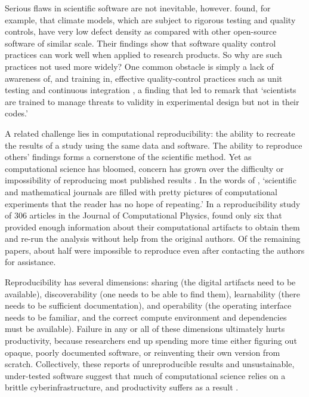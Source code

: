 \documentclass[12pt]{amsart}
\begin{document}
Serious flaws in scientific software are not inevitable, however. \citet{pipitone2012assessing} found, for example, that climate models, which are subject to rigorous testing and quality controls, have very low defect density as compared with other open-source software of similar scale. Their findings show that software quality control practices can work well when applied to research products. So why are such practices not used more widely? One common obstacle is simply a lack of awareness of, and training in, effective quality-control practices such as unit testing and continuous integration \citep{wilson2006s,faulk2009scientific,hannay2009scientists,kanewala2014testing}, a finding that led \citet{faulk2009scientific} to remark that `scientists are trained to manage threats to validity in experimental design but not in their codes.'

A related challenge lies in computational reproducibility: the ability to recreate the results of a study using the same data and software. The ability to reproduce others' findings forms a cornerstone of the scientific method. Yet as computational science has bloomed, concern has grown over the difficulty or impossibility of reproducing most published results \citep[e.g.,][]{schwab2000making,peng2011reproducible,stodden2013setting,barba2016hard,alnoamany2018towards,chen2019open,krafczyk2019scientific}. In the words of \citet{leveque2009python}, `scientific and mathematical journals are filled with pretty pictures of computational experiments that the reader has no hope of repeating.' In a reproducibility study of 306 articles in the Journal of Computational Physics, \citet{stodden2018enabling} found only six that provided enough information about their computational artifacts to obtain them and re-run the analysis without help from the original authors. Of the remaining papers, about half were impossible to reproduce even after contacting the authors for assistance.

Reproducibility has several dimensions: sharing (the digital artifacts need to be available), discoverability (one needs to be able to find them), learnability (there needs to be sufficient documentation), and operability (the operating interface needs to be familiar, and the correct compute environment and dependencies must be available). Failure in any or all of these dimensions ultimately hurts productivity, because researchers end up spending more time either figuring out opaque, poorly documented software, or reinventing their own version from scratch. Collectively, these reports of unreproducible results and unsustainable, under-tested software suggest that much of computational science relies on a brittle cyberinfrastructure, and productivity suffers as a result \citep{wilson2006s,faulk2009scientific,prabhu2011survey}.
\end{document}
